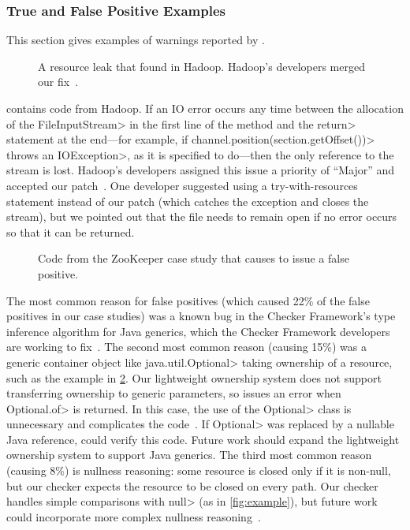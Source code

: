 \subsubsection{True and False Positive Examples}
\label{sec:examples}

This section gives examples of warnings reported by \tool.

\begin{figure}
  
  \prefigcaption
  \caption{A resource leak that \tool found in Hadoop. Hadoop's developers
    merged our fix~\cite{hdfs-15791}.}
  \label{fig:hadoop-bug}
\end{figure}

 contains code from Hadoop. If an IO error
occurs any time between the allocation of the \<FileInputStream>
in the first line of the method and the \<return> statement
at the end---for example, if \<channel.position(section.getOffset())>
throws an \<IOException>, as it is specified to do---then the
only reference to the stream is lost. Hadoop's developers
assigned this issue a priority of ``Major'' and accepted our
patch~\cite{hdfs-15791}.
One developer suggested using a try-with-resources statement instead
of our patch (which catches the exception and closes the stream),
but we pointed out that
the file needs to remain open if no error occurs so that it can be
returned.

\begin{figure}
  
  \prefigcaption
  \caption{Code from the ZooKeeper case study that causes \tool
  to issue a false positive.}
  \label{fig:zookeeper-optional}
\end{figure}

The most common reason for false
positives (which caused 22\% of the false positives in our case studies) was
a known bug in the Checker Framework's
type inference algorithm for Java generics, which the Checker Framework
developers are working to fix~\cite{issue979}.
The second most common reason (causing 15\%)
was a generic container object like \<java.util.Optional> taking ownership of a resource, such
as the example in \cref{fig:zookeeper-optional}. Our lightweight ownership
system does not support transferring ownership to generic parameters,
so \tool issues an error when \<Optional.of> is returned. In this case, the use
of the \<Optional> class is unnecessary and complicates the
code~\cite{ErnstNothingIsBetterThanOptional}.  If \<Optional> was replaced
by a nullable Java reference,
\tool could verify this code. Future work should expand the lightweight ownership system to
support Java generics.
The third most common reason (causing 8\%) is nullness reasoning: some resource
is closed only if it is non-null, but our checker expects the resource to be
closed on every path. Our checker handles simple comparisons with
\<null> (as in \cref{fig:example}), but future work could
incorporate more complex nullness reasoning~\cite{PapiACPE2008}.

